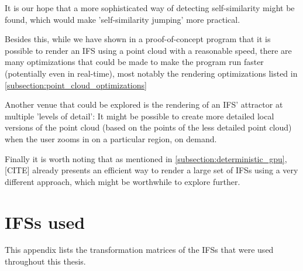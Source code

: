 \documentclass[11pt]{article}
\begin{document}
It is our hope that a more sophisticated way of detecting self-similarity might be found,
which would make 'self-similarity jumping' more practical.

Besides this, while we have shown in a proof-of-concept program that it is possible to render an IFS using a point cloud
with a reasonable speed, there are many optimizations that could be made to make the program run faster (potentially even in real-time),
most notably the rendering optimizations listed in \autoref{subsection:point_cloud_optimizations}

Another venue that could be explored is the rendering of an IFS' attractor at multiple 'levels of detail':
It might be possible to create more detailed local versions of the point cloud (based on the points of the less detailed point cloud) when the user
zooms in on a particular region, on demand.

Finally it is worth noting that as mentioned in \autoref{subsection:deterministic_gpu}, [CITE] already presents an efficient way to render a large set of IFSs using a very different approach, 
which might be worthwhile to explore further.

\appendix

\section{IFSs used}
\label{sec:orgef3f2cf}

This appendix lists the transformation matrices of the IFSs that were used throughout this thesis.


\label{ifs:sierpinsky}
\label{ifs:barnsley_fern}
\label{ifs:dragon_curve}
\end{document}
